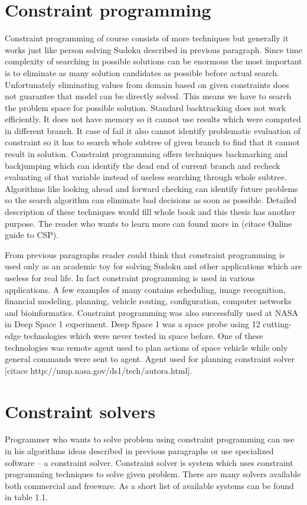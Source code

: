 \section{Constraint programming}
Constraint programming of course consists of more techniques but generally it works 
just like person solving Sudoku described in previous paragraph. Since time complexity 
of searching in possible solutions can be enormous the most important is to eliminate as 
many solution candidates as possible before actual search. Unfortunately eliminating values 
from domain based on given constraints does not guarantee that model can be directly solved. 
This means we have to search the problem space for possible solution. Standard backtracking 
does not work efficiently. It does not have memory so it cannot use results which 
were computed in different branch. It case of fail it also cannot identify problematic 
evaluation of constraint so it has to search whole subtree of given branch to find 
that it cannot result in solution. Constraint programming offers techniques backmarking 
and backjumping which can identify the dead end of current branch and recheck evaluating 
of that variable instead of useless searching through whole subtree. Algorithms 
like looking ahead and forward checking can identify future problems so the search 
algorithm can eliminate bad decisions as soon as possible. Detailed description 
of these techniques would fill whole book and this thesis has another purpose. 
The reader who wants to learn more can found more in (citace Online guide to CSP).

From previous paragraphs reader could think that constraint programming is used 
only as an academic toy for solving Sudoku and other applications which are useless 
for real life. In fact constraint programming is used in various applications. 
A few examples of many contains scheduling, image recognition, financial modeling, 
planning, vehicle routing, configuration, computer networks and bioinformatics. 
Constraint programming was also successfully used at NASA in Deep Space 1 experiment. 
Deep Space 1 was a space probe using 12 cutting-edge technologies which were never 
tested in space before. One of these technologies was remote agent used to plan 
actions of space vehicle while only general commands were sent to agent. Agent 
used for planning constraint solver [citace http://nmp.nasa.gov/ds1/tech/autora.html].

\section{Constraint solvers}
Programmer who wants to solve problem using constraint programming can use in his 
algorithms ideas described in previous paragraphs or use specialized software -- a 
constraint solver. Constraint solver is system which uses constraint programming 
techniques to solve given problem. There are many solvers available both commercial 
and freeware. As a short list of available systems can be found in table 1.1.

